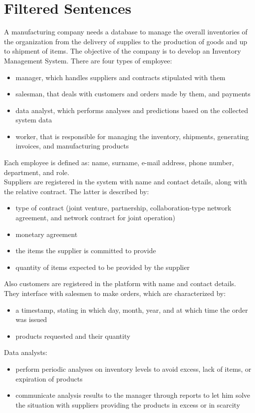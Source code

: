 \section{Filtered Sentences}

A manufacturing company needs a database to manage the overall inventories of the organization from the delivery of supplies to the production of goods and up to shipment of items. The objective of the company is to develop an Inventory Management System.
There are four types of employee:
\begin{itemize}
	\item manager, which handles suppliers and contracts stipulated with them
	\item salesman, that deals with customers and orders made by them, and payments
	\item data analyst, which performs analyses and predictions based on the collected system data
	\item worker, that is responsible for managing the inventory, shipments, generating invoices, and manufacturing products
\end{itemize}
Each employee is defined as: name, surname, e-mail address, phone number, department, and role.\\
Suppliers are registered in the system with name and contact details, along with the relative contract. The latter is described by:
\begin{itemize}
	\item type of contract (joint venture, partnership, collaboration-type network agreement, and network contract for joint operation)
	\item monetary agreement
	\item the items the supplier is committed to provide
	\item quantity of items expected to be provided by the supplier
\end{itemize}
Also customers are registered in the platform with name and contact details. They interface with salesmen to make orders, which are characterized by:
\begin{itemize}
	\item a timestamp, stating in which day, month, year, and at which time the order was issued
	\item products requested and their quantity
\end{itemize}
Data analysts:
\begin{itemize}
	\item perform periodic analyses on inventory levels to avoid excess, lack of items, or expiration of products
	\item communicate analysis results to the manager through reports to let him solve the situation with suppliers providing the products in excess or in scarcity
\end{itemize}